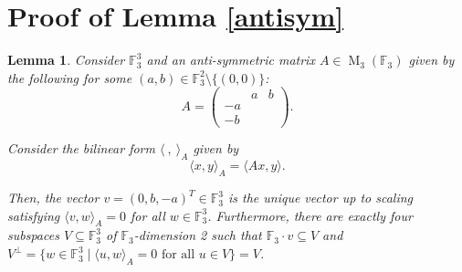 \documentclass{eptcs}
\newtheorem{lemma}[theorem]{Lemma}
\theoremstyle{remark}
\theoremstyle{definition}
\DeclareMathOperator{\M}{M}
\begin{document}
\section{Proof of Lemma \ref{antisym}}
\label{proofappendixc}
\begin{lemma}
Consider $\mathbb{F}_{3}^{3}$ and an anti-symmetric matrix $A \in \M_{3}(\mathbb{F}_{3})$ given by the following for some $(a,b) \in \mathbb{F}_{3}^{2} \setminus \{(0,0)\}$:
\begin{equation}
    A 
    = 
    \begin{pmatrix}
	\ &  a & b \\ 
	-a & & \\ 
	-b & & 
    \end{pmatrix}.
\end{equation}

Consider the bilinear form $\langle\ , \ \rangle_{A}$ given by 
\begin{equation}
    \langle x,y\rangle_{A}  = \langle A x, y \rangle.
\end{equation}

Then, the vector $v=(0,b,-a)^{T} \in \mathbb{F}_{3}^{3}$ is the unique vector up to scaling satisfying $\langle v ,w \rangle_{A} = 0$ for all $w \in \mathbb{F}_{3}^{3}$. Furthermore, there are exactly four subspaces $V \subseteq \mathbb{F}_{3}^{3}$ of $\mathbb{F}_{3}$-dimension 2 such that $\mathbb{F}_{3} \cdot v \subseteq V$ and $V^{\perp} = \{ w \in \mathbb{F}_{3}^{3} \mid \langle u,w \rangle_{A} = 0 \text{ for all }u \in V\} = V$.
\end{lemma}
\end{document}
